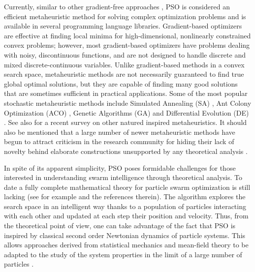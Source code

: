 \documentclass{ims9x6}
\begin{document}
Currently, similar to other gradient-free approaches \cite{Back:1997:HEC:548530,Blum:2003:MCO:937503.937505,Gendreau:2010:HM:1941310,8843624,larson_menickelly_wild_2019,neumaier_2004,Audet2017}, PSO is considered an efficient metaheuristic method for solving complex optimization problems and is available in several programming language libraries. Gradient-based optimizers are effective at finding local minima for high-dimensional, nonlinearly constrained convex problems; however, most gradient-based optimizers have problems dealing with noisy, discontinuous functions, and are not designed to handle discrete and mixed discrete-continuous variables. Unlike gradient-based methods in a convex search space, metaheuristic methods are not necessarily guaranteed to find true global optimal solutions, but they are capable of finding many good solutions that are sometimes sufficient in practical applications. 
 Some of the most popular stochastic metaheuristic methods include Simulated Annealing (SA) \cite{holley1988simulated,kirkpatrick1983optimization,Aarts:1989:SAB:61990}, Ant Colony Optimization (ACO) \cite{dorigo1996ant,dorigo2005ant}, Genetic Algorithms (GA) \cite{Holland:1992:ANA:531075,Goldberg1989genetic} and Differential Evolution (DE) \cite{Fogel:2006:ECT:1202305, Storn1997differential}. See also \cite{8843624} for a recent survey on other natured inspired metaheuristics. It should also be mentioned that a large number of newer  metaheuristic methods have begun to attract criticism in the research community for hiding their lack of novelty behind elaborate constructions unsupported by any theoretical analysis \cite{Sorensen}. 

In spite of its apparent simplicity, PSO poses formidable challenges for those interested in understanding swarm intelligence through theoretical analysis. To date a fully complete mathematical theory for particle swarm optimization is still lacking (see for example \cite{bruned2019weak,Schmitt2015convergence,XU2018709,Bellomo17,poli2009mean,zhang2015comprehensive} and the references therein). The algorithm explores the search space in an intelligent way thanks to a population of particles interacting with each other and updated at each step their position and velocity. Thus, from the theoretical point of view, one can take advantage of the fact that PSO is inspired by classical second order Newtonian dynamics of particle systems. This allows approaches derived from statistical mechanics and mean-field theory to be adapted to the study of the system properties in the limit of a large number of particles \cite{Jab2,Snitzman,Golse,Jab,CC1,CC4,huangmf,BCC}. 
 
\end{document}

